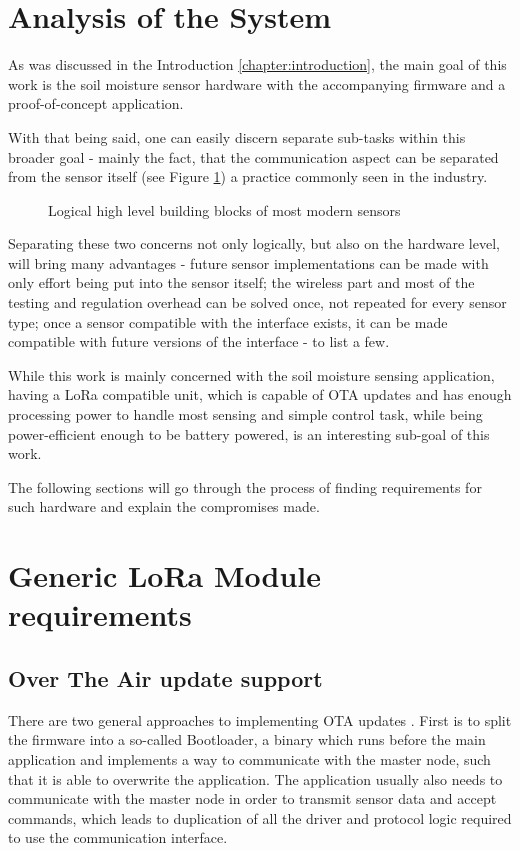 
\section{Analysis of the System}
As was discussed in the Introduction \ref{chapter:introduction}, the main goal of this work is the soil moisture sensor hardware with the accompanying firmware and a proof-of-concept application.

With that being said, one can easily discern separate sub-tasks within this broader goal - mainly the fact, that the communication aspect can be separated from the sensor itself (see Figure \ref{fig:device-split}) a practice commonly seen in the industry.

\begin{figure}
    
    \caption{\label{fig:device-split}Logical high level building blocks of most modern sensors}
\end{figure}

Separating these two concerns not only logically, but also on the hardware level, will bring many advantages - future sensor implementations can be made with only effort being put into the sensor itself; the wireless part and most of the testing and regulation overhead can be solved once, not repeated for every sensor type; once a sensor compatible with the interface exists, it can be made compatible with future versions of the interface - to list a few.

While this work is mainly concerned with the soil moisture sensing application, having a LoRa compatible unit, which is capable of OTA updates and has enough processing power to handle most sensing and simple control task, while being power-efficient enough to be battery powered, is an interesting sub-goal of this work.

The following sections will go through the process of finding requirements for such hardware and explain the compromises made.

\section{Generic LoRa Module requirements}
\subsection{\label{section:ota-update-support}Over The Air update support}
There are two general approaches to implementing OTA updates \cite{bucklin_brown_over--air_2024,noauthor_android_2024}. First is to split the firmware into a so-called Bootloader, a binary which runs before the main application and implements a way to communicate with the master node, such that it is able to overwrite the application. The application usually also needs to communicate with the master node in order to transmit sensor data and accept commands, which leads to duplication of all the driver and protocol logic required to use the communication interface.

